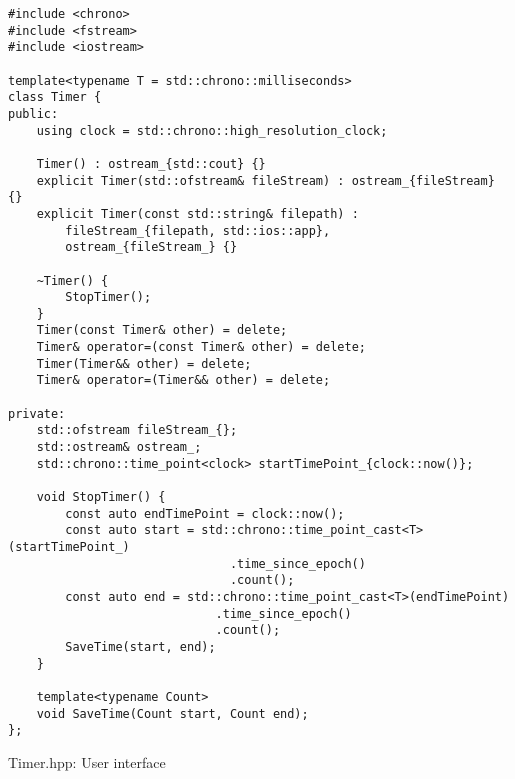 \begin{listing}[htb]
\begin{verbatim}
#include <chrono>
#include <fstream>
#include <iostream>

template<typename T = std::chrono::milliseconds>
class Timer {
public:
    using clock = std::chrono::high_resolution_clock;

    Timer() : ostream_{std::cout} {}
    explicit Timer(std::ofstream& fileStream) : ostream_{fileStream} {}
    explicit Timer(const std::string& filepath) :
        fileStream_{filepath, std::ios::app},
        ostream_{fileStream_} {}

    ~Timer() {
        StopTimer();
    }
    Timer(const Timer& other) = delete;
    Timer& operator=(const Timer& other) = delete;
    Timer(Timer&& other) = delete;
    Timer& operator=(Timer&& other) = delete;

private:
    std::ofstream fileStream_{};
    std::ostream& ostream_;
    std::chrono::time_point<clock> startTimePoint_{clock::now()};

    void StopTimer() {
        const auto endTimePoint = clock::now();
        const auto start = std::chrono::time_point_cast<T>(startTimePoint_)
                               .time_since_epoch()
                               .count();
        const auto end = std::chrono::time_point_cast<T>(endTimePoint)
                             .time_since_epoch()
                             .count();
        SaveTime(start, end);
    }

    template<typename Count>
    void SaveTime(Count start, Count end);
};
\end{verbatim}
\caption{Timer.hpp: User interface}
\label{lst:timer_interface}
\end{listing}

